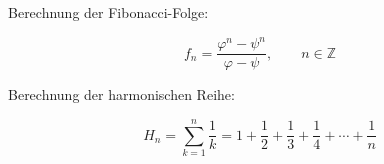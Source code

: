
Berechnung der Fibonacci-Folge:

\begin{equation}
f_n = \frac{\varphi^n - \psi^n}{\varphi-\psi}, \qquad n \in \mathbb Z
\end{equation}

\noindent Berechnung der harmonischen Reihe:

\begin{equation}
H_n=\sum_{k=1}^n \frac{1}{k}=1 + \frac{1}{2} + \frac{1}{3} + \frac{1}{4} + \cdots +\frac{1}{n}
\end{equation}



